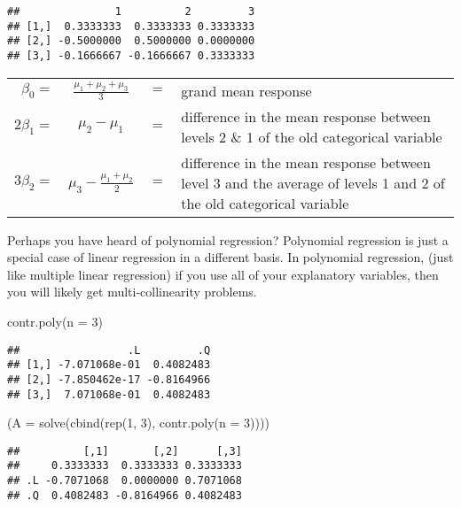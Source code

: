 \documentclass[
]{book}
\newenvironment{Shaded}{\begin{snugshade}}{\end{snugshade}}
\newcommand{\AttributeTok}[1]{\textcolor[rgb]{0.77,0.63,0.00}{#1}}
\newcommand{\DecValTok}[1]{\textcolor[rgb]{0.00,0.00,0.81}{#1}}
\newcommand{\FunctionTok}[1]{\textcolor[rgb]{0.00,0.00,0.00}{#1}}
\newcommand{\NormalTok}[1]{#1}
\begin{document}
\begin{verbatim}
##               1          2         3
## [1,]  0.3333333  0.3333333 0.3333333
## [2,] -0.5000000  0.5000000 0.0000000
## [3,] -0.1666667 -0.1666667 0.3333333
\end{verbatim}

\begin{tabularx}{\textwidth}{r c c X}
\(\beta_0 =\) &\(\tfrac{\mu_1+\mu_2+\mu_3}{3}\) &\(=\) &grand mean response \\
\(2\beta_1 =\) &\(\mu_2 - \mu_1\) &\(=\) &difference in the mean response between levels 2 \& 1 of the old categorical variable \\
\(3\beta_2 =\) &\(\mu_3 - \tfrac{\mu_1+\mu_2}{2}\) &\(=\) &difference in the mean response between level 3 and the average of levels 1 and 2 of the old categorical variable
\end{tabularx}

Perhaps you have heard of polynomial regression? Polynomial regression
is just a special case of linear regression in a different basis. In
polynomial regression, (just like multiple linear regression) if you use
all of your explanatory variables, then you will likely get
multi-collinearity problems.

\begin{Shaded}
\begin{Highlighting}[]
\FunctionTok{contr.poly}\NormalTok{(}\AttributeTok{n =} \DecValTok{3}\NormalTok{)}
\end{Highlighting}
\end{Shaded}

\begin{verbatim}
##                 .L         .Q
## [1,] -7.071068e-01  0.4082483
## [2,] -7.850462e-17 -0.8164966
## [3,]  7.071068e-01  0.4082483
\end{verbatim}

\begin{Shaded}
\begin{Highlighting}[]
\NormalTok{(}\AttributeTok{A =} \FunctionTok{solve}\NormalTok{(}\FunctionTok{cbind}\NormalTok{(}\FunctionTok{rep}\NormalTok{(}\DecValTok{1}\NormalTok{, }\DecValTok{3}\NormalTok{), }\FunctionTok{contr.poly}\NormalTok{(}\AttributeTok{n =} \DecValTok{3}\NormalTok{))))}
\end{Highlighting}
\end{Shaded}

\begin{verbatim}
##          [,1]       [,2]      [,3]
##     0.3333333  0.3333333 0.3333333
## .L -0.7071068  0.0000000 0.7071068
## .Q  0.4082483 -0.8164966 0.4082483
\end{verbatim}
\end{document}
